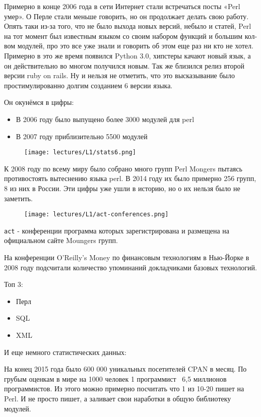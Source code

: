 Примерно в конце 2006 года в сети Интернет стали встречаться посты «Perl умер». О Перле стали меньше говорить, но он продолжает делать свою работу. Опять таки из-за того, что не было выхода новых версий, небыло и статей, Perl на тот момент был известным языком со своим набором функций и большим кол-вом модулей, про это все уже знали и говорить об этом еще раз ни кто не хотел. Примерно в это же время появился Python 3.0, хипстеры качают новый язык, а он действительно во многом получился новым. Так же близился релиз второй версии ruby on rails. Ну и нельзя не отметить, что это высказывание было простимулированно долгим созданием 6 версии языка.

Он окунёмся в цифры:
\begin{itemize}
 \item В 2006 году было выпущено более 3000 модулей для perl
 \item В 2007 году приблизительно 5500 модулей
\end{itemize}

\begin{figure}[H] \centering
  \texttt{[image: lectures/L1/stats6.png]}
\end{figure}\noindent

К 2008 году по всему миру было собрано много групп Perl Mongers пытаясь противостоять вытеснению языка perl. В 2014 году их было примерно 256 групп, 8 из них в России. Эти цифры уже ушли в историю, но о их нельзя было не заметить.

\begin{figure}[H] \centering
  \texttt{[image: lectures/L1/act-conferences.png]}
\end{figure}\noindent

\verb|act| - конференции программа которых зарегистрирована и размещена на официальном сайте Moungers групп.

На конференции O'Reilly's Money по финансовым технологиям в Нью-Йорке в 2008 году подсчитали количество упоминаний докладчиками базовых технологий.

Топ 3:
\begin{itemize}
 \item Перл
 \item SQL
 \item XML
\end{itemize}

И еще немного статистических данных:

На конец 2015 года было 600 000 уникальных посетителей CPAN в месяц. По грубым оценкам в мире на 1000 человек 1 программист ~6,5 миллионов программистов. Из этого можно примерно посчитать что 1 из 10-20 пишет на Perl. И не просто пишет, а заливает свои наработки в общую библиотеку модулей.


